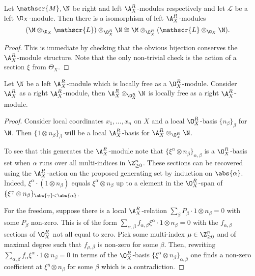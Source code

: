 \begin{lemma}\label{lem: IsomorphismTensors}
  Let $\mathscr{M}, \N$ be right and left $\A_X^R$-modules respectively and let $\mathscr{L}$ be a left $\D_X$-module. Then there is a isomorphism of left $\A_X^R$-modules
  $$(\M \otimes_{\O_X} \mathscr{L})\otimes_{\O_X^R} \N \cong \M \otimes_{\O_X^R} (\mathscr{L}\otimes_{\O_X} \N).   $$
\end{lemma}
\begin{proof}
  This is immediate by checking that the obvious bijection conserves the $\A_X^R$-module structure. Note that the only non-trivial check is the action of a section $\xi$ from $\Theta_X$.
\end{proof}
\begin{lemma}\label{lem: FreeLeftAModuleTensor}
  Let $\N$ be a left $\A_X^R$-module which is locally free as a $\O_X^R$-module. Consider $\A_X^R$ as a right $\A_X^R$-module, then $\A_X^R \otimes_{\O_X^R} \N$ is locally free as a right $\A_X^R$-module.
\end{lemma}
\begin{proof}
  Consider local coordinates $x_1,\ldots, x_n$ on $X$ and a local $\O_X^R$-basis $\{n_\beta\}_\beta$ for $\N$. Then $\{1\otimes n_\beta\}_{\beta}$ will be a local $\A_X^R$-basis for $\A_X^R \otimes_{\O_X^R} \N$.

  To see that this generates the $\A_X^R$-module note that $\{\xi^\alpha \otimes n_\beta\}_{\alpha,\beta}$
  is a $\O_X^R$-basis set when $\alpha$ runs over all multi-indices in $\Z_{\geq 0}^n$.
  These sections can be recovered using the $\A_X^R$-action on the proposed generating set by induction on $\abs{\alpha}$.
  Indeed, $\xi^\alpha \cdot (1 \otimes n_\beta)$ equals $\xi^\alpha \otimes n_\beta$ up to a element in the $\O_X^R$-span of $\{\xi^\gamma \otimes n_\beta\}_{\abs{\gamma}<\abs{\alpha}}$.

  For the freedom, suppose there is a local $\A_X^R$-relation $\sum_\beta P_\beta \cdot 1\otimes n_\beta = 0$ with some $P_\beta$ non-zero. This is of the form $\sum_{\alpha, \beta} f_{\alpha,\beta} \xi^\alpha \cdot 1\otimes n_\beta = 0$ with the $f_{\alpha,\beta}$ sections of $\O_X^R$ not all equal to zero.
  Pick some multi-index $\mu\in \Z_{\geq 0}^n$ and of maximal degree such that $f_{\mu,\beta}$ is non-zero for some $\beta$.
  Then, rewriting $\sum_{\alpha, \beta} f_\alpha \xi^\alpha \cdot 1\otimes n_\beta = 0$ in terms of the $\O_X^R$-basis $\{\xi^\alpha \otimes n_\beta\}_{\alpha,\beta}$ one finds a non-zero coefficient at $\xi^\eta \otimes n_\beta$ for some $\beta$ which is a contradiction.
\end{proof}
